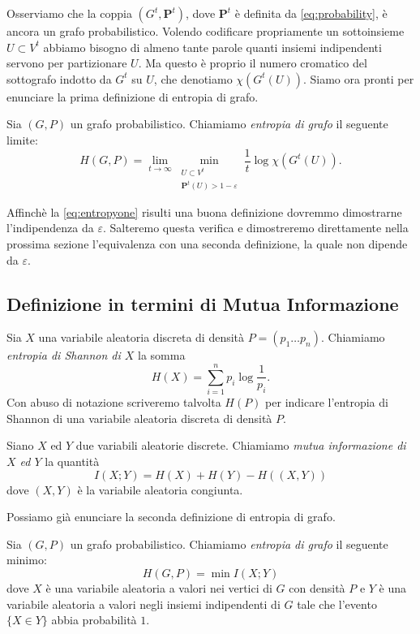 Osserviamo che la coppia \((G^t, \mathbf{P}^t)\), dove \(\mathbf{P}^t\) è definita da \eqref{eq:probability}, è ancora un grafo probabilistico. Volendo codificare propriamente un sottoinsieme \(U\subset V^{t}\) abbiamo bisogno di almeno tante parole quanti insiemi indipendenti servono per partizionare \(U\). Ma questo è proprio il numero cromatico del sottografo indotto da \(G^t\) su \(U\), che denotiamo \(\chi(G^t(U))\). Siamo ora pronti per enunciare la prima definizione di entropia di grafo. 
\begin{definition}
  Sia \((G,P)\) un grafo probabilistico. Chiamiamo \emph{entropia di grafo} il seguente limite: 
  \begin{equation}
    \label{eq:entropyone} H(G,P)=\lim_{t\to \infty} \min_{\substack{ U\subset V^t\\\mathbf{P}^t(U)>1-\varepsilon}} \frac{1}{t}\log{\chi(G^t(U))}. 
  \end{equation}
\end{definition}

Affinchè la \ref{eq:entropyone} risulti una buona definizione dovremmo dimostrarne l'indipendenza da \(\varepsilon\). Salteremo questa verifica e dimostreremo direttamente nella prossima sezione l'equivalenza con una seconda definizione, la quale non dipende da \(\varepsilon\).

\subsection{Definizione in termini di Mutua Informazione} 
\begin{definition}
  Sia \(X\) una variabile aleatoria discreta di densità \(P=(p_1\dots p_n)\). Chiamiamo \emph{entropia di Shannon di \(X\)} la somma
  \[H(X)=\sum_{i=1}^n p_i \log{\frac{1}{p_i}}.\]
  Con abuso di notazione scriveremo talvolta \(H(P)\) per indicare l'entropia di Shannon di una variabile aleatoria discreta di densit\`a \(P\). 
\end{definition}
\begin{definition}
  Siano \(X\) ed \(Y\) due variabili aleatorie discrete. Chiamiamo \emph{mutua informazione di \(X\) ed \(Y\)} la quantità
  \[I(X;Y)=H(X)+H(Y)-H((X,Y))\]
  dove \((X,Y)\) è la variabile aleatoria congiunta. 
\end{definition}

Possiamo già enunciare la seconda definizione di entropia di grafo. 
\begin{definition}
  Sia \((G,P)\) un grafo probabilistico. Chiamiamo \emph{entropia di grafo} il seguente minimo: 
  \begin{equation}
    \label{eq:entropytwo} H(G,P)=\min I(X;Y) 
  \end{equation}
  dove \(X\) è una variabile aleatoria a valori nei vertici di \(G\) con densità \(P\) e \(Y\) è una variabile aleatoria a valori negli insiemi indipendenti di \(G\) tale che l'evento \(\{X\in Y\}\) abbia probabilità \(1\). 
\end{definition}


